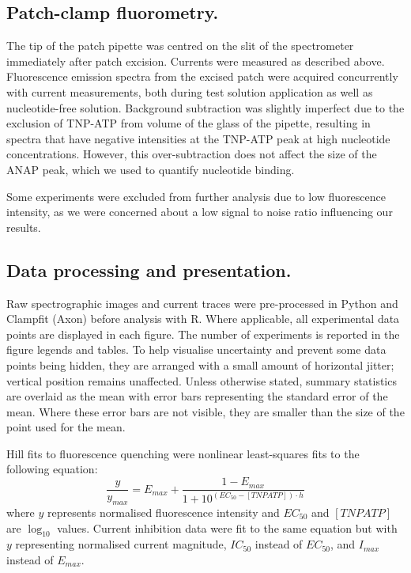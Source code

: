\documentclass[10pt,lineno, doublespacing]{elife_modified}
\begin{document}
\subsection{Patch-clamp fluorometry.}
The tip of the patch pipette was centred on the slit of the spectrometer immediately after patch excision.
Currents were measured as described above.
Fluorescence emission spectra from the excised patch were acquired concurrently with current measurements, both during test solution application as well as nucleotide-free solution.
Background subtraction was slightly imperfect due to the exclusion of TNP-ATP from volume of the glass of the pipette, resulting in spectra that have negative intensities at the TNP-ATP peak at high nucleotide concentrations.
However, this over-subtraction does not affect the size of the ANAP peak, which we used to quantify nucleotide binding.

Some experiments were excluded from further analysis due to low fluorescence intensity, as we were concerned about a low signal to noise ratio influencing our results.

\subsection{Data processing and presentation.}
Raw spectrographic images and current traces were pre-processed in Python and Clampfit (Axon) before analysis with R.
Where applicable, all experimental data points are displayed in each figure.
The number of experiments is reported in the figure legends and tables.
To help visualise uncertainty and prevent some data points being hidden, they are arranged with a small amount of horizontal jitter; vertical position remains unaffected.
Unless otherwise stated, summary statistics are overlaid as the mean with error bars representing the standard error of the mean.
Where these error bars are not visible, they are smaller than the size of the point used for the mean.

Hill fits to fluorescence quenching were nonlinear least-squares fits to the following equation:
\begin{equation} \label{eq:hill}
    \frac{y}{y_{max}} = E_{max} + \frac{1 - E_{max}}{1 + 10^{(EC_{50} - [TNPATP]) \cdot h}}
\end{equation}
where $y$ represents normalised fluorescence intensity and $EC_{50}$ and $[TNPATP]$ are $\log_{10}$ values.
Current inhibition data were fit to the same equation but with $y$ representing normalised current magnitude, $IC_{50}$ instead of $EC_{50}$, and $I_{max}$ instead of $E_{max}$.
\end{document}
